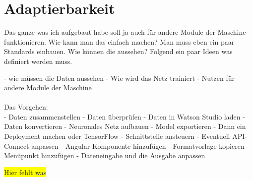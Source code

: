\chapter{Adaptierbarkeit}
Das ganze was ich aufgebaut habe soll ja auch für andere Module der Maschine funktionieren. Wie kann man das einfach
machen? Man muss eben ein paar Standards einbauen. Wie können die aussehen? Folgend ein paar Ideen was definiert werden
muss.

- wie müssen die Daten aussehen
- Wie wird das Netz trainiert
- Nutzen für andere Module der Maschine\\ \\

Das Vorgehen: \\
- Daten zusammenstellen
- Daten überprüfen
- Daten in Watson Studio laden
- Daten konvertieren
- Neuronales Netz aufbauen
- Model exportieren
- Dann ein Deployment machen oder TensorFlow
- Schnittstelle ansteuern
- Eventuell API-Connect anpassen
- Angular-Komponente hinzufügen
- Formatvorlage kopieren
- Menüpunkt hinzufügen
- Dateneingabe und die Ausgabe anpassen

\colorbox{yellow}{Hier fehlt was}